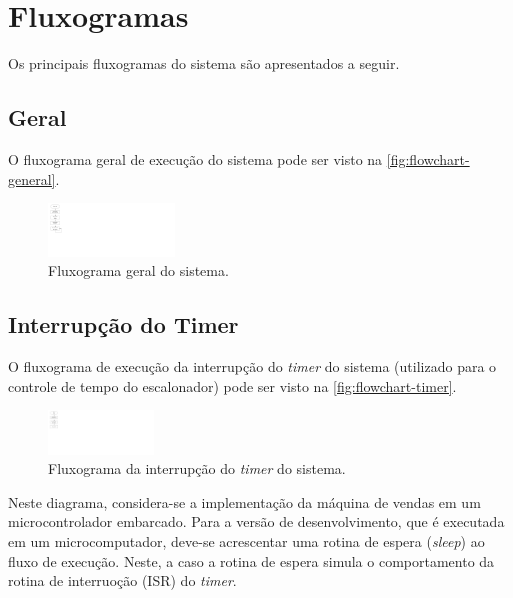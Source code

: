 %
%
%
%
%

%
%
%
%
%

\section{Fluxogramas} \label{sec:flowcharts}

Os principais fluxogramas do sistema são apresentados a seguir.

\subsection{Geral}

O fluxograma geral de execução do sistema pode ser visto na \autoref{fig:flowchart-general}.

\begin{figure}[!ht]
    \begin{center}
        \includegraphics[width=0.3\textwidth]{figures/flowchart_general.pdf}
        \caption{Fluxograma geral do sistema.}
        \label{fig:flowchart-general}
    \end{center}
\end{figure}

\subsection{Interrupção do Timer}

O fluxograma de execução da interrupção do \textit{timer} do sistema (utilizado para o controle de tempo do escalonador) pode ser visto na \autoref{fig:flowchart-timer}.

\begin{figure}[!ht]
    \begin{center}
        \includegraphics[width=0.25\textwidth]{figures/flowchart_timer.pdf}
        \caption{Fluxograma da interrupção do \textit{timer} do sistema.}
        \label{fig:flowchart-timer}
    \end{center}
\end{figure}

Neste diagrama, considera-se a implementação da máquina de vendas em um microcontrolador embarcado. Para a versão de desenvolvimento, que é executada em um microcomputador, deve-se acrescentar uma rotina de espera (\textit{sleep}) ao fluxo de execução. Neste, a caso a rotina de espera simula o comportamento da rotina de interruoção (ISR) do \textit{timer}.
